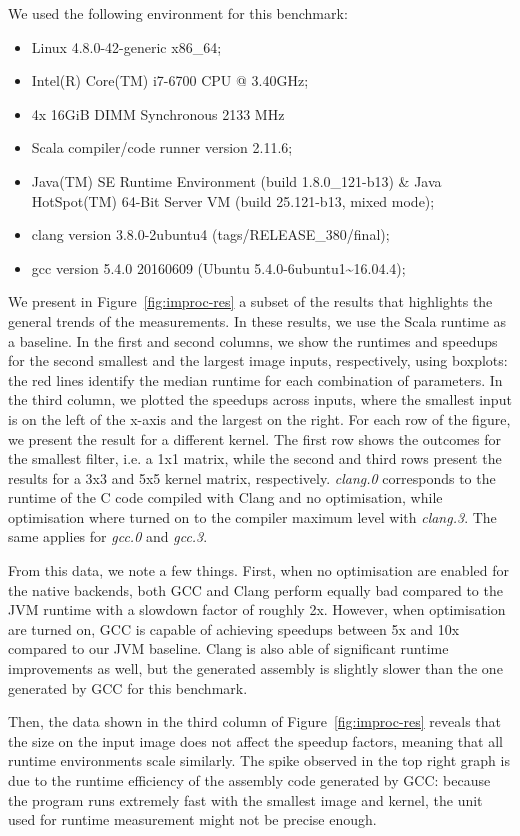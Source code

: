 \documentclass[a4paper,twoside]{article}
\newcommand{\RefFig}[1]{Figure~\ref{#1}}
\begin{document}
\pagebreak
We used the following environment for this benchmark:
\begin{itemize}
\item Linux 4.8.0-42-generic x86\_64;
\item Intel(R) Core(TM) i7-6700 CPU @ 3.40GHz;
\item 4x 16GiB DIMM Synchronous 2133 MHz
\item Scala compiler/code runner version 2.11.6;
\item Java(TM) SE Runtime Environment (build 1.8.0\_121-b13) \&
      Java HotSpot(TM) 64-Bit Server VM (build 25.121-b13, mixed mode);
\item clang version 3.8.0-2ubuntu4 (tags/RELEASE\_380/final);
\item gcc version 5.4.0 20160609 (Ubuntu 5.4.0-6ubuntu1\~{}16.04.4);
\end{itemize}

We present in \RefFig{fig:improc-res} a subset of the results that highlights
the general trends of the measurements. In these results, we use the Scala
runtime as a baseline. In the first and second columns, we show the runtimes and
speedups for the second smallest and the largest image inputs, respectively,
using boxplots: the red lines identify the median runtime for each combination
of parameters. In the third column, we plotted the speedups across inputs, where
the smallest input is on the left of the x-axis and the largest on the right.
For each row of the figure, we present the result for a different kernel. The
first row shows the outcomes for the smallest filter, i.e. a 1x1 matrix, while
the second and third rows present the results for a 3x3 and 5x5 kernel matrix,
respectively. \emph{clang.0} corresponds to the runtime of the C code compiled
with Clang and no optimisation, while optimisation where turned on to the
compiler maximum level with \emph{clang.3}. The same applies for \emph{gcc.0}
and \emph{gcc.3}.

From this data, we note a few things. First, when no optimisation are enabled
for the native backends, both GCC and Clang perform equally bad compared to the
JVM runtime with a slowdown factor of roughly 2x. However, when optimisation are
turned on, GCC is capable of achieving speedups between 5x and 10x compared to
our JVM baseline. Clang is also able of significant runtime improvements as
well, but the generated assembly is slightly slower than the one generated by
GCC for this benchmark.

Then, the data shown in the third column of \RefFig{fig:improc-res} reveals that
the size on the input image does not affect the speedup factors, meaning that
all runtime environments scale similarly. The spike observed in the top right
graph is due to the runtime efficiency of the assembly code generated by GCC:
because the program runs extremely fast with the smallest image and kernel, the
unit used for runtime measurement might not be precise enough.
\end{document}
